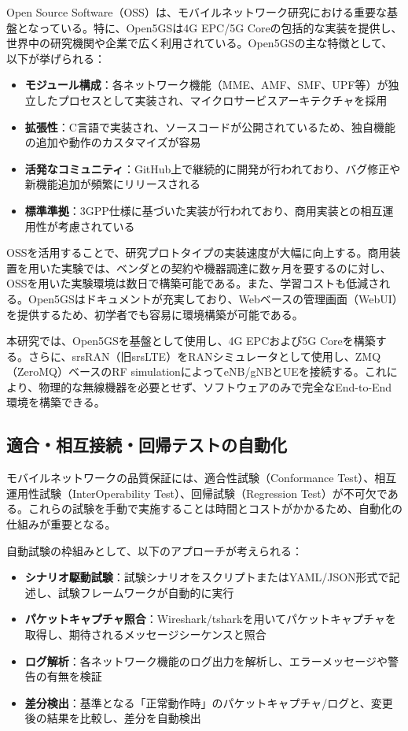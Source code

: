Open Source Software（OSS）は、モバイルネットワーク研究における重要な基盤となっている。特に、Open5GSは4G EPC/5G Coreの包括的な実装を提供し、世界中の研究機関や企業で広く利用されている。Open5GSの主な特徴として、以下が挙げられる：

\begin{itemize}
\item \textbf{モジュール構成}：各ネットワーク機能（MME、AMF、SMF、UPF等）が独立したプロセスとして実装され、マイクロサービスアーキテクチャを採用
\item \textbf{拡張性}：C言語で実装され、ソースコードが公開されているため、独自機能の追加や動作のカスタマイズが容易
\item \textbf{活発なコミュニティ}：GitHub上で継続的に開発が行われており、バグ修正や新機能追加が頻繁にリリースされる
\item \textbf{標準準拠}：3GPP仕様に基づいた実装が行われており、商用実装との相互運用性が考慮されている
\end{itemize}

OSSを活用することで、研究プロトタイプの実装速度が大幅に向上する。商用装置を用いた実験では、ベンダとの契約や機器調達に数ヶ月を要するのに対し、OSSを用いた実験環境は数日で構築可能である。また、学習コストも低減される。Open5GSはドキュメントが充実しており、Webベースの管理画面（WebUI）を提供するため、初学者でも容易に環境構築が可能である。

本研究では、Open5GSを基盤として使用し、4G EPCおよび5G Coreを構築する。さらに、srsRAN（旧srsLTE）をRANシミュレータとして使用し、ZMQ（ZeroMQ）ベースのRF simulationによってeNB/gNBとUEを接続する。これにより、物理的な無線機器を必要とせず、ソフトウェアのみで完全なEnd-to-End環境を構築できる。

\subsection{適合・相互接続・回帰テストの自動化}

モバイルネットワークの品質保証には、適合性試験（Conformance Test）、相互運用性試験（InterOperability Test）、回帰試験（Regression Test）が不可欠である。これらの試験を手動で実施することは時間とコストがかかるため、自動化の仕組みが重要となる。

自動試験の枠組みとして、以下のアプローチが考えられる：

\begin{itemize}
\item \textbf{シナリオ駆動試験}：試験シナリオをスクリプトまたはYAML/JSON形式で記述し、試験フレームワークが自動的に実行
\item \textbf{パケットキャプチャ照合}：Wireshark/tsharkを用いてパケットキャプチャを取得し、期待されるメッセージシーケンスと照合
\item \textbf{ログ解析}：各ネットワーク機能のログ出力を解析し、エラーメッセージや警告の有無を検証
\item \textbf{差分検出}：基準となる「正常動作時」のパケットキャプチャ/ログと、変更後の結果を比較し、差分を自動検出
\end{itemize}


